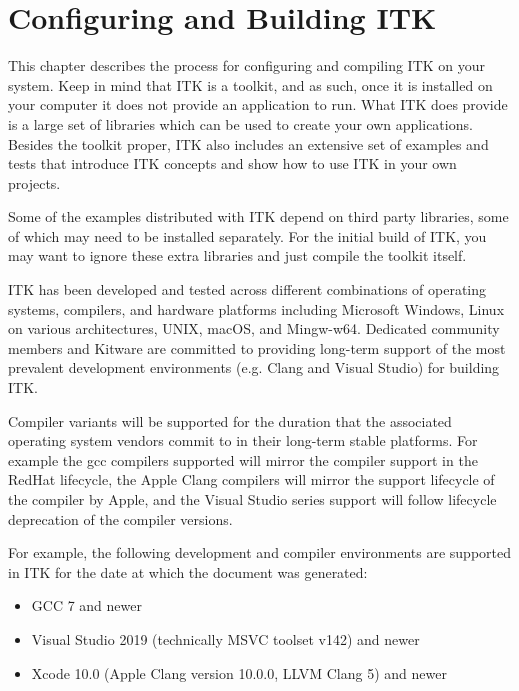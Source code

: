 \chapter{Configuring and Building ITK}
\label{chapter:Installation}

This chapter describes the process for configuring and compiling ITK on your
system. Keep in mind that ITK is a toolkit, and as such, once it is installed
on your computer it does not provide an application to run. What ITK does
provide is a large set of libraries which can be used to create your own
applications. Besides the toolkit proper, ITK also includes an extensive set of
examples and tests that introduce ITK concepts and show how to use ITK in your
own projects.

Some of the examples distributed with ITK depend on third party libraries, some
of which may need to be installed separately. For the initial build of ITK, you
may want to ignore these extra libraries and just compile the toolkit itself.

ITK has been developed and tested across different combinations of operating
systems, compilers, and hardware platforms including Microsoft Windows, Linux on
various architectures, UNIX, macOS, and Mingw-w64. Dedicated community members and
Kitware are committed to providing long-term support of the most prevalent
development environments (e.g. Clang and Visual Studio) for building ITK.

Compiler variants will be supported for the duration that the associated operating
system vendors commit to in their long-term stable platforms. For example the gcc
compilers supported will mirror the compiler support in the RedHat lifecycle, the
Apple Clang compilers will mirror the support lifecycle of the compiler by Apple, and
the Visual Studio series support will follow lifecycle deprecation of the compiler
versions.

For example, the following development and compiler environments are supported
in ITK for the date at which the document was generated:
\begin{itemize}
\item GCC 7 and newer
\item Visual Studio 2019 (technically MSVC toolset v142) and newer
\item Xcode 10.0 (Apple Clang version 10.0.0, LLVM Clang 5) and newer
\end{itemize}

